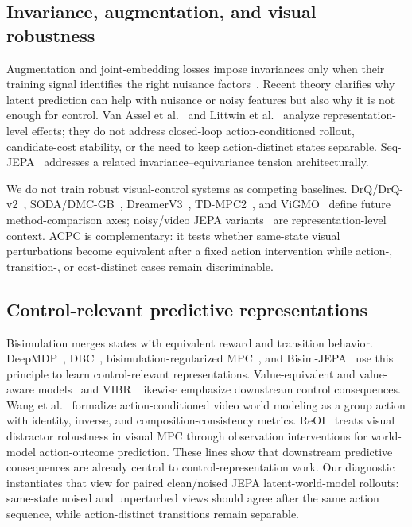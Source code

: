 \documentclass[10pt]{article}
\begin{document}
\subsection{Invariance, augmentation, and visual robustness}
Augmentation and joint-embedding losses impose invariances only when their training signal identifies the right nuisance factors~\cite{wang2020alignuniform,tamkin2023featuredropout,zhang2022rethinkaug}. Recent theory clarifies why latent prediction can help with nuisance or noisy features but also why it is not enough for control. Van Assel et al.~\cite{vanassel2025jointembeddingreconstruction} and Littwin et al.~\cite{littwin2024jepaavoidsnoisyfeatures} analyze representation-level effects; they do not address closed-loop action-conditioned rollout, candidate-cost stability, or the need to keep action-distinct states separable. Seq-JEPA~\cite{ghaemi2025seqjepa} addresses a related invariance--equivariance tension architecturally.

We do not train robust visual-control systems as competing baselines. DrQ/DrQ-v2~\cite{kostrikov2020drq,yarats2022drqv2}, SODA/DMC-GB~\cite{hansen2021soda}, DreamerV3~\cite{hafner2025dreamerv3}, TD-MPC2~\cite{hansen2024tdmpc2}, and ViGMO~\cite{vigmo} define future method-comparison axes; noisy/video JEPA variants~\cite{njepa2025,huang2026vjepa,usjepa2025} are representation-level context. ACPC is complementary: it tests whether same-state visual perturbations become equivalent after a fixed action intervention while action-, transition-, or cost-distinct cases remain discriminable.

\subsection{Control-relevant predictive representations}
Bisimulation merges states with equivalent reward and transition behavior. DeepMDP~\cite{gelada2019deepmdp}, DBC~\cite{zhang2021dbc}, bisimulation-regularized MPC~\cite{bsmpc}, and Bisim-JEPA~\cite{toso2026bisimjepa} use this principle to learn control-relevant representations. Value-equivalent and value-aware models~\cite{grimm2020valueequivalence,voelcker2025calibratedvalueaware} and VIBR~\cite{dupuis2023vibr} likewise emphasize downstream control consequences. Wang et al.~\cite{wang2026groupactions} formalize action-conditioned video world modeling as a group action with identity, inverse, and composition-consistency metrics. ReOI~\cite{chen2025reoi} treats visual distractor robustness in visual MPC through observation interventions for world-model action-outcome prediction. These lines show that downstream predictive consequences are already central to control-representation work. Our diagnostic instantiates that view for paired clean/noised JEPA latent-world-model rollouts: same-state noised and unperturbed views should agree after the same action sequence, while action-distinct transitions remain separable.
\end{document}
